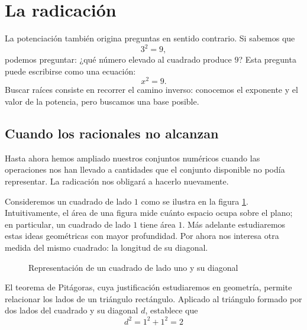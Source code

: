 \section{La radicación}

La potenciación también origina preguntas en sentido contrario. Si sabemos que
\[
3^2=9,
\]
podemos preguntar: ¿qué número elevado al cuadrado produce \(9\)? Esta pregunta puede escribirse como una ecuación:
\[
x^2=9.
\]
Buscar raíces consiste en recorrer el camino inverso: conocemos el exponente y el valor de la potencia, pero buscamos una base posible.

\subsection{Cuando los racionales no alcanzan}

Hasta ahora hemos ampliado nuestros conjuntos numéricos cuando las operaciones nos han llevado a cantidades que el conjunto disponible no podía representar. La radicación nos obligará a hacerlo nuevamente.

Consideremos un cuadrado de lado \(1\) como se ilustra en la figura \ref{fig:square}. Intuitivamente, el área de una figura mide cuánto espacio ocupa sobre el plano; en particular, un cuadrado de lado \(1\) tiene área \(1\). Más adelante estudiaremos estas ideas geométricas con mayor profundidad. Por ahora nos interesa otra medida del mismo cuadrado: la longitud de su diagonal.

\begin{figure}[!ht]
  \centering
  \caption{Representación de un cuadrado de lado uno y su diagonal}
  \label{fig:square}
\end{figure}

El teorema de Pitágoras, cuya justificación estudiaremos en geometría, permite relacionar los lados de un triángulo rectángulo. Aplicado al triángulo formado por dos lados del cuadrado y su diagonal \(d\), establece que
\[
d^2=1^2+1^2=2
\]


